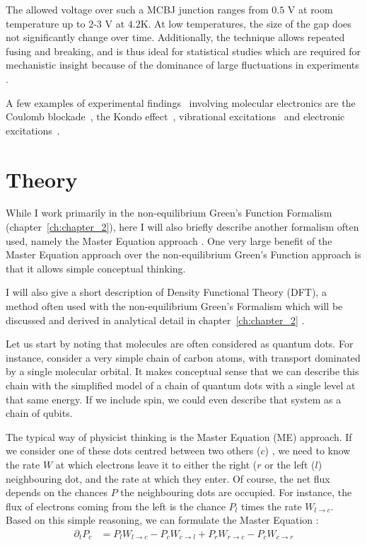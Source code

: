 The allowed voltage over such a MCBJ junction ranges from $0.5$ V at room temperature up to $2$-$3$ V at $4.2$K. At low temperatures, the size of the gap does not significantly change over time. Additionally, the technique allows repeated fusing and breaking, and is thus ideal for statistical studies which are required for mechanistic insight because of the dominance of large fluctuations in experiments \cite{ratnerrev2013}.

A few examples of experimental findings~\cite{koole} involving molecular electronics are the Coulomb blockade~\cite{Park2000, Park2002}, the Kondo effect~\cite{Park2002}, vibrational excitations~\cite{vib1, vib2} and electronic excitations~\cite{elec1}.

\section{Theory}
While I work primarily in the non-equilibrium Green's Function Formalism (chapter~\ref{ch:chapter_2}), here I will also briefly describe another formalism often used, namely the Master Equation approach \cite{seldenthuis}. One very large benefit of the Master Equation approach over the non-equilibrium Green's Function approach is that it allows simple conceptual thinking.

I will also give a short description of Density Functional Theory (DFT), a method often used with the non-equilibrium Green's Formalism which will be discussed and derived in analytical detail in chapter~\ref{ch:chapter_2}  .

Let us start by noting that molecules are often considered as quantum dots. For instance, consider a very simple chain of carbon atoms, with transport dominated by a single molecular orbital. It makes conceptual sense that we can describe this chain with the simplified model of a chain of quantum dots with a single level at that same energy. If we include spin, we could even describe that system as a chain of qubits.

The typical way of physicist thinking is the Master Equation (ME) approach. If we consider one of these dots centred between two others ($c$) , we need to know the rate $W$ at which electrons leave it to either the right ($r$ or the left ($l$) neighbouring dot, and the rate at which they enter. Of course, the net flux depends on the chances $P$ the neighbouring dots are occupied. For instance, the flux of electrons coming from the left is the chance $P_l$ times the rate $W_{l\rightarrow c}$. Based on this simple reasoning, we can formulate the Master Equation \cite{beenakker}:
\begin{align*}
\partial_t P_c &= P_l W_{l\rightarrow c} - P_c W_{c\rightarrow l} + P_r  W_{r\rightarrow c} - P_c W_{c\rightarrow r}
\end{align*}

